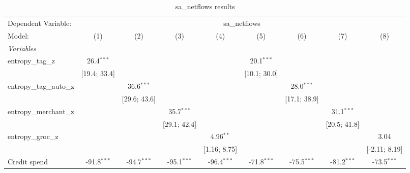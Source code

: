 
\begin{table}[htbp]
   \centering
   \tiny
   \begin{threeparttable}[b]
      \caption{\label{tab:reg_sa_netflows_full} sa\_netflows results}
      \begin{tabular}{lcccccccc}
         \tabularnewline \midrule \midrule
         Dependent Variable: & \multicolumn{8}{c}{sa\_netflows}\\
         Model:                   & (1)             & (2)             & (3)             & (4)             & (5)             & (6)             & (7)             & (8)\\  
         \midrule
         \emph{Variables}\\
         entropy\_tag\_z          & 26.4$^{***}$    &                 &                 &                 & 20.1$^{***}$    &                 &                 &   \\   
                                  & [19.4; 33.4]    &                 &                 &                 & [10.1; 30.0]    &                 &                 &   \\   
         entropy\_tag\_auto\_z    &                 & 36.6$^{***}$    &                 &                 &                 & 28.0$^{***}$    &                 &   \\   
                                  &                 & [29.6; 43.6]    &                 &                 &                 & [17.1; 38.9]    &                 &   \\   
         entropy\_merchant\_z     &                 &                 & 35.7$^{***}$    &                 &                 &                 & 31.1$^{***}$    &   \\   
                                  &                 &                 & [29.1; 42.4]    &                 &                 &                 & [20.5; 41.8]    &   \\   
         entropy\_groc\_z         &                 &                 &                 & 4.96$^{**}$     &                 &                 &                 & 3.04\\   
                                  &                 &                 &                 & [1.16; 8.75]    &                 &                 &                 & [-2.11; 8.19]\\   
         Credit spend             & -91.8$^{***}$   & -94.7$^{***}$   & -95.1$^{***}$   & -96.4$^{***}$   & -71.8$^{***}$   & -75.5$^{***}$   & -81.2$^{***}$   & -73.5$^{***}$\\   

\end{tabular}
\end{threeparttable}
\end{table}
